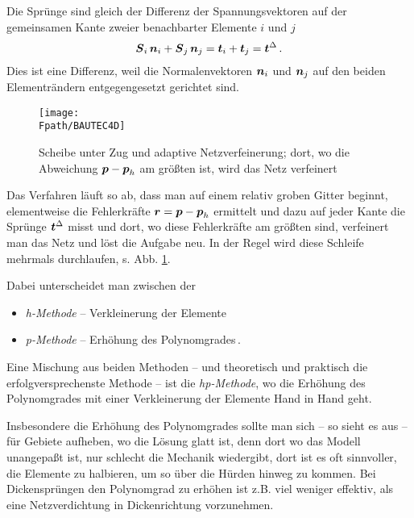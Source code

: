 {{Die Spr\"{u}nge sind gleich der Differenz der Spannungsvektoren auf der gemeinsamen Kante zweier benachbarter Elemente $i$ und $j$
\begin{align}\label{Sprungt}
\mbox{\boldmath $S$}_i \,\mbox{\boldmath $n$}_i + \mbox{\boldmath $S$}_{j}\,\mbox{\boldmath $n$}_{j} = \mbox{\boldmath $t$}_i + \mbox{\boldmath $t$}_{j} = \mbox{\boldmath $t$}^\Delta\,.
\end{align}
Dies ist eine Differenz, weil die Normalenvektoren $\mbox{\boldmath $n$}_i$ und $\mbox{\boldmath $n$}_{j}$ auf den
beiden Elementr\"{a}ndern entgegengesetzt gerichtet sind.
\begin{figure}[tbp] \centering
\if {} \sidecaption \fi
\texttt{[image: \\Fpath/BAUTEC4D]}
\caption{Scheibe unter Zug und adaptive Netzverfeinerung; dort, wo die Abweichung $\mbox{\boldmath $p$} - \mbox{\boldmath $p$}_h$ am gr\"{o}{\ss}ten ist, wird das Netz verfeinert} \label{Bautec4}
\end{figure}%


Das Verfahren l\"{a}uft so ab, dass man auf einem relativ groben Gitter beginnt, elementweise die Fehlerkr\"{a}fte $\mbox{\boldmath $r$} = \mbox{\boldmath $p$} - \mbox{\boldmath $p$}_h$ ermittelt und dazu auf jeder Kante die Spr\"{u}nge $\mbox{\boldmath $t$}^\Delta$ misst und dort, wo diese Fehlerkr\"{a}fte am gr\"{o}{\ss}ten sind, verfeinert man das Netz und l\"{o}st die Aufgabe neu. In der Regel wird diese Schleife mehrmals durchlaufen, s. Abb. \ref{Bautec4}.

Dabei unterscheidet man zwischen der\\

\begin{itemize}
\item {\em h-Methode}  -- Verkleinerung der Elemente
\item {\em p-Methode} -- Erh\"{o}hung des Polynomgrades\,.
\end{itemize}
Eine Mischung aus beiden Methoden -- und theoretisch und praktisch die erfolgversprechenste Methode -- ist die {\em hp-Methode}, wo die Erh\"{o}hung des Polynomgrades mit einer Verkleinerung der Elemente Hand in Hand geht.

Insbesondere die Erh\"{o}hung des Polynomgrades sollte man sich -- so sieht es aus -- f\"{u}r Gebiete aufheben, wo die L\"{o}sung glatt ist, denn dort wo das Modell unangepa{\ss}t ist, nur schlecht die Mechanik wiedergibt, dort ist es oft sinnvoller, die Elemente zu halbieren, um so \"{u}ber die H\"{u}rden hinweg zu kommen. Bei Dickenspr\"{u}ngen den Polynomgrad zu erh\"{o}hen ist z.B. viel weniger effektiv, als eine Netzverdichtung in Dickenrichtung vorzunehmen.

}}
